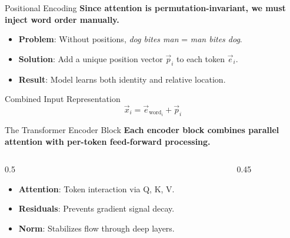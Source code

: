 \documentclass[aspectratio=169]{beamer}
\newif\ifanimated
\newcommand{\cpause}{\ifanimated\pause\fi}
\begin{document}
\begin{frame}{Positional Encoding}
\textbf{Since attention is permutation-invariant, we must inject word order manually.}

\vspace{0.8em}
\begin{itemize}
    \item \textbf{Problem}: Without positions, \textit{dog bites man} = \textit{man bites dog}.
    \item \textbf{Solution}: Add a unique position vector $\vec{p}_i$ to each token $\vec{e}_i$.
    \item \textbf{Result}: Model learns both identity and relative location.
\end{itemize}

\vspace{1em}
\cpause
\begin{block}{Combined Input Representation}
\[
\vec{x}_i = \vec{e}_{\text{word}_i} + \vec{p}_i
\]
\end{block}
\end{frame}

\begin{frame}{The Transformer Encoder Block}
\textbf{Each encoder block combines parallel attention with per-token feed-forward processing.}

\vspace{0.8em}
\begin{columns}
\begin{column}{0.5\textwidth}
\begin{itemize}
    \item \textbf{Attention}: Token interaction via Q, K, V.
    \item \textbf{Residuals}: Prevents gradient signal decay.
    \item \textbf{Norm}: Stabilizes flow through deep layers.
\end{itemize}\cpause

\end{column}

\begin{column}{0.45\textwidth}
\begin{center}

\end{center}
\end{column}
\end{columns}
\end{frame}
\end{document}
